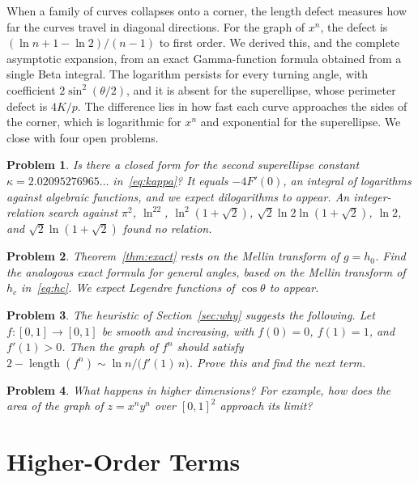 \documentclass[journal]{IEEEtran}
\newtheorem{problem}{Problem}
\begin{document}
When a family of curves collapses onto a corner, the length defect measures how far the curves
travel in diagonal directions. For the graph of $x^n$, the defect is $(\ln n+1-\ln2)/(n-1)$ to
first order. We derived this, and the complete asymptotic expansion, from an exact
Gamma-function formula obtained from a single Beta integral. The logarithm persists for every
turning angle, with coefficient $2\sin^2(\theta/2)$, and it is absent for the superellipse,
whose perimeter defect is $4K/p$. The difference lies in how fast each curve approaches the
sides of the corner, which is logarithmic for $x^n$ and exponential for the superellipse. We
close with four open problems.

\begin{problem}
Is there a closed form for the second superellipse constant $\kappa=2.02095276965\ldots$
in~\eqref{eq:kappa}? It equals $-4F'(0)$, an integral of logarithms against algebraic
functions, and we expect dilogarithms to appear. An integer-relation search against $\pi^2$,
$\ln^22$, $\ln^2(1+\sqrt2)$, $\sqrt2\ln2\ln(1+\sqrt2)$, $\ln2$, and $\sqrt2\ln(1+\sqrt2)$ found no
relation.
\end{problem}

\begin{problem}
Theorem~\ref{thm:exact} rests on the Mellin transform of $g=h_0$. Find the analogous exact
formula for general angles, based on the Mellin transform of $h_c$ in~\eqref{eq:hc}. We expect
Legendre functions of $\cos\theta$ to appear.
\end{problem}

\begin{problem}
The heuristic of Section~\ref{sec:why} suggests the following. Let $f:[0,1]\to[0,1]$ be smooth
and increasing, with $f(0)=0$, $f(1)=1$, and $f'(1)>0$. Then the graph of $f^n$ should satisfy
$2-\operatorname{length}(f^n)\sim\ln n/\bigl(f'(1)\,n\bigr)$. Prove this and find the next term.
\end{problem}

\begin{problem}
What happens in higher dimensions? For example, how does the area of the graph of $z=x^ny^n$
over $[0,1]^2$ approach its limit?
\end{problem}

\appendices

\section{Higher-Order Terms}\label{app:higher}
\end{document}
